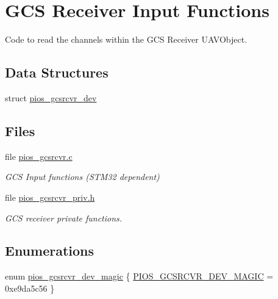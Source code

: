 \hypertarget{group___p_i_o_s___g_c_s_r_c_v_r}{\section{\-G\-C\-S \-Receiver \-Input \-Functions}
\label{group___p_i_o_s___g_c_s_r_c_v_r}
}


\-Code to read the channels within the \-G\-C\-S \-Receiver \-U\-A\-V\-Object.  


\subsection*{\-Data \-Structures}
\begin{DoxyCompactItemize}
\item 
struct \hyperlink{structpios__gcsrcvr__dev}{pios\-\_\-gcsrcvr\-\_\-dev}
\end{DoxyCompactItemize}
\subsection*{\-Files}
\begin{DoxyCompactItemize}
\item 
file \hyperlink{pios__gcsrcvr_8c}{pios\-\_\-gcsrcvr.\-c}
\begin{DoxyCompactList}\small\item\em \-G\-C\-S \-Input functions (\-S\-T\-M32 dependent) \end{DoxyCompactList}\item 
file \hyperlink{pios__gcsrcvr__priv_8h}{pios\-\_\-gcsrcvr\-\_\-priv.\-h}
\begin{DoxyCompactList}\small\item\em \-G\-C\-S receiver private functions. \end{DoxyCompactList}\end{DoxyCompactItemize}
\subsection*{\-Enumerations}
\begin{DoxyCompactItemize}
\item 
enum \hyperlink{group___p_i_o_s___g_c_s_r_c_v_r_ga88de96a8f2cf14a06395b79f0996c923}{pios\-\_\-gcsrcvr\-\_\-dev\-\_\-magic} \{ \hyperlink{group___p_i_o_s___g_c_s_r_c_v_r_gga88de96a8f2cf14a06395b79f0996c923a88da7c25cec48e88113746c212106823}{\-P\-I\-O\-S\-\_\-\-G\-C\-S\-R\-C\-V\-R\-\_\-\-D\-E\-V\-\_\-\-M\-A\-G\-I\-C} =  0xe9da5c56
 \}
\end{DoxyCompactItemize}
